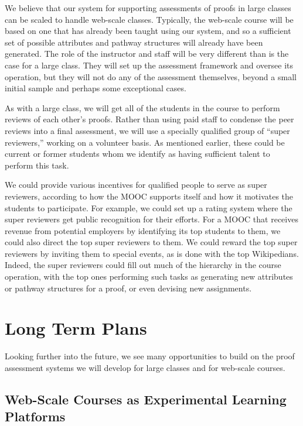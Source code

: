 \documentclass[12pt]{article}
\begin{document}
We believe that our system for supporting assessments of proofs in
large classes can be scaled to handle web-scale classes.  Typically,
the web-scale course will be based on one that has already been
taught using our system, and so a sufficient set of possible attributes and
pathway structures will already have been generated.  The role of the
instructor and staff will be very different than is the case for a
large class.  They will set up the assessment framework and oversee
its operation, but they will not do any of the assessment themselves,
beyond a small initial sample and perhaps some exceptional cases.

As with a large class, we will get all of the students in the course
to perform reviews of each other's proofs.  Rather than using paid
staff to condense the peer reviews into a final assessment, we will
use a specially qualified group of ``super reviewers,'' working on a
volunteer basis.  As mentioned earlier, these could be current or
former students whom we identify as having sufficient talent to
perform this task.

We could provide various incentives for qualified people to serve as
super reviewers, according to how the MOOC supports itself and how it
motivates the students to participate.  For example, we could set up a
rating system where the super reviewers get public recognition for
their efforts.  For a MOOC that receives revenue from potential
employers by identifying its top students to them, we could also
direct the top super reviewers to them.  We could reward the top super
reviewers by inviting them to special events, as is done with the top
Wikipedians.  Indeed, the super reviewers could fill out much of the
hierarchy in the course operation, with the top ones performing such
tasks as generating new attributes or pathway structures for a proof,
or even devising new assignments.

\section{Long Term Plans}

Looking further into the future, we see many opportunities to build on
the proof assessment systems we will develop for large classes and for
web-scale courses.

\subsection{Web-Scale Courses as Experimental Learning Platforms}
\end{document}
